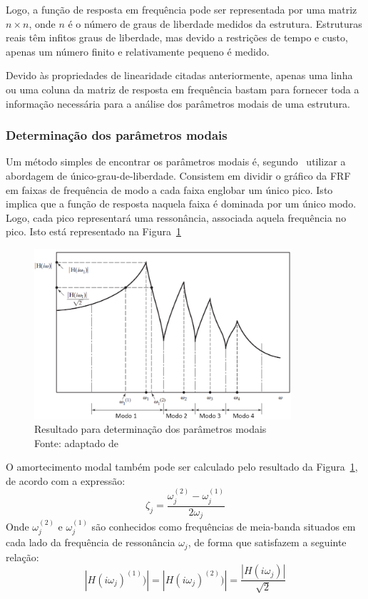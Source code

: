 Logo, a função de resposta em frequência pode ser representada por uma matriz $n
\times n$, onde $n$ é o número de graus de liberdade medidos da estrutura.
Estruturas reais têm infitos graus de liberdade, mas devido a restrições de
tempo e custo, apenas um número finito e relativamente pequeno é medido.

Devido às propriedades de linearidade citadas anteriormente, apenas uma linha ou
uma coluna da matriz de resposta em frequência bastam para fornecer toda a
informação necessária para a análise dos parâmetros modais de uma estrutura.


\subsubsection{Determinação dos parâmetros modais}

Um método simples de encontrar os parâmetros modais é,
segundo~\citet{rao2011mechanical} utilizar a abordagem de
único-grau-de-liberdade. Consistem em dividir o gráfico da FRF em faixas de
frequência de modo a cada faixa englobar um único pico. Isto implica que a
função de resposta naquela faixa é dominada por um único modo. Logo, cada pico
representará uma ressonância, associada aquela frequência no pico. Isto está
representado na Figura~\ref{fig::tipical_frf}

\begin{figure}[h]
	\centering 
 	\includegraphics[width=0.85\textwidth]{figs/tipical_frf}
 	\caption[Resultado para determinação dos parâmetros modais]{Resultado para
 	determinação dos parâmetros modais \\ Fonte: adaptado de
 	\cite{rao2011mechanical}}
 	\label{fig::tipical_frf}
\end{figure}

O amortecimento modal também pode ser calculado pelo resultado da
Figura~\ref{fig::tipical_frf}, de acordo com a expressão:
%
\begin{equation}
	\zeta_j = \frac{\omega_j^{(2)} - \omega_j^{(1)}}{2 \omega_j}
\end{equation}
%
Onde $\omega_j^{(2)}$ e $\omega_j^{(1)}$ são conhecidos como frequências de
meia-banda situados em cada lado da frequência de ressonância $\omega_j$, de
forma que satisfazem a seguinte relação:
%
\begin{equation}
	\left | H(i\omega_j)^{(1)}) \right | = \left | H(i\omega_j)^{(2)}) \right | =
	\frac{\left | H(i\omega_j) \right |}{\sqrt{2}}
\end{equation}

